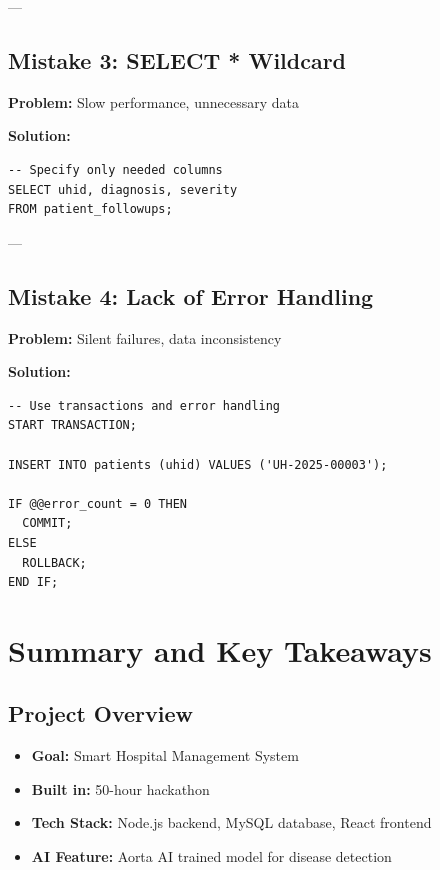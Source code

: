 \documentclass[12pt,a4paper]{article}
\begin{document}
---

\subsection{Mistake 3: SELECT * Wildcard}

\textbf{Problem:} Slow performance, unnecessary data

\textbf{Solution:}
\begin{lstlisting}
-- Specify only needed columns
SELECT uhid, diagnosis, severity 
FROM patient_followups;
\end{lstlisting}

---

\subsection{Mistake 4: Lack of Error Handling}

\textbf{Problem:} Silent failures, data inconsistency

\textbf{Solution:}
\begin{lstlisting}
-- Use transactions and error handling
START TRANSACTION;

INSERT INTO patients (uhid) VALUES ('UH-2025-00003');

IF @@error_count = 0 THEN
  COMMIT;
ELSE
  ROLLBACK;
END IF;
\end{lstlisting}

\section{Summary and Key Takeaways}

\subsection{Project Overview}
\begin{itemize}
    \item \textbf{Goal:} Smart Hospital Management System
    \item \textbf{Built in:} 50-hour hackathon
    \item \textbf{Tech Stack:} Node.js backend, MySQL database, React frontend
    \item \textbf{AI Feature:} Aorta AI trained model for disease detection
\end{itemize}
\end{document}
